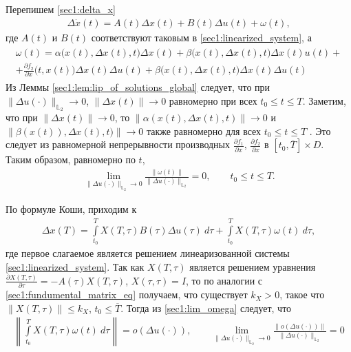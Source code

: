 \documentclass[../main.tex]{subfiles}
\begin{document}
Перепишем \eqref{sec1:delta_x}
\begin{gather}\label{sec1:delta_x_rewritten}
    \Delta \dot{x}(t) =
    A(t) \Delta x(t)  + 
    B(t) \Delta u(t)  + 
    \omega(t),
\end{gather}
где $A(t)$ и $B(t)$ соответствуют таковым в \eqref{sec1:linearized_system}, а
\begin{gather*}
\begin{gathered}
    \omega(t) = 
    \alpha\big(x(t),\Delta x(t), t\big) \Delta x(t)  + 
    \beta\big(x(t),\Delta x(t), t\big)  \Delta x(t) u(t)  + \\ +
    \frac{\partial f_2}{\partial x} \Big(t, x(t)\Big) \Delta x(t) \Delta u(t) + 
    \beta\Big(x(t),\Delta x(t), t\Big) \Delta x(t) \Delta u(t) 
\end{gathered}    
\end{gather*}
Из Леммы \ref{sec1:lem:lip_of_solutions_global} следует, что при $\|\Delta u(\cdot)\|_{\mathbb{L}_2} \to 0$, $\|\Delta x(t)\| \to 0$ равномерно при всех $t_0 \leqslant t \leqslant T$.
Заметим, что при $\|\Delta x(t)\| \to 0$, то $ \left\|  \alpha(x(t),\Delta x(t), t) \right\|  \to 0 $ и $ \left\|  \beta(x(t)),\Delta x(t), t) \right\|  \to 0 $ также равномерно для всех  $ t_0 \leqslant t \leqslant T $ .
Это следует из равномерной непрерывности производных $\frac{\partial f_1}{\partial x}$, $\frac{\partial f_2}{\partial x}$ в $[t_0, \overline{T}] \times D$.
Таким образом, равномерно по $t$,
\begin{gather}\label{sec1:lim_omega}
    \lim\limits_{\|\Delta u(\cdot) \|_{\mathbb{L}_2} \to 0}  \frac{ \| \omega(t) \| }{\|\Delta u(\cdot) \|_{\mathbb{L}_2}}  = 0, \qquad  t_0 \leqslant t \leqslant T .
\end{gather}
    
По формуле Коши, приходим к 
\begin{gather*}
    \Delta x(T) = \int\limits_{t_0}^{T} X(T, \tau) B(\tau) \Delta u(\tau) \ d\tau + \int\limits_{t_0}^{T}  X(T, \tau) \omega(t) \ d\tau,
\end{gather*}
где первое слагаемое является решением линеаризованной системы \eqref{sec1:linearized_system}.
Так как $X(T, \tau) $ является решением уравнения $\frac{\partial X(T, \tau) }{\partial \tau} = -A(\tau)X(T, \tau)$, $X(\tau, \tau) = I$, то по аналогии с \eqref{sec1:fundumental_matrix_eq}  получаем, что существует $k_X > 0$, такое что $\|X(T, \tau) \| \leqslant k_X$, $t_0 \leqslant \overline{T} $.
Тогда из \eqref{sec1:lim_omega} следует, что 
\begin{gather*}
    \left\|\int\limits_{t_0}^{T}  X(T, \tau) \omega(t) \ d\tau  \right\| = o(\Delta u(\cdot)), \qquad \lim\limits_{\|\Delta u(\cdot) \|_{\mathbb{L}_2} \to 0}  \frac{ \| o(\Delta u(\cdot)) \| }{\|\Delta u(\cdot) \|_{\mathbb{L}_2}}  = 0
\end{gather*}
    
\end{document}
